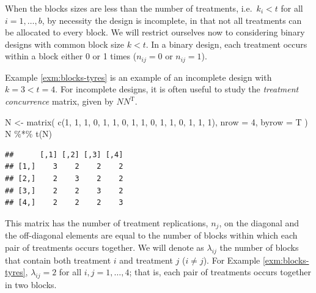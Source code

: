 \documentclass[
]{book}
\newenvironment{Shaded}{\begin{snugshade}}{\end{snugshade}}
\newcommand{\AttributeTok}[1]{\textcolor[rgb]{0.77,0.63,0.00}{#1}}
\newcommand{\DecValTok}[1]{\textcolor[rgb]{0.00,0.00,0.81}{#1}}
\newcommand{\FunctionTok}[1]{\textcolor[rgb]{0.00,0.00,0.00}{#1}}
\newcommand{\NormalTok}[1]{#1}
\newcommand{\OtherTok}[1]{\textcolor[rgb]{0.56,0.35,0.01}{#1}}
\newcommand{\SpecialCharTok}[1]{\textcolor[rgb]{0.00,0.00,0.00}{#1}}
\theoremstyle{definition}
\theoremstyle{definition}
\theoremstyle{definition}
\theoremstyle{definition}
\theoremstyle{remark}
\begin{document}
When the blocks sizes are less than the number of treatments, i.e.~\(k_i < t\) for all \(i=1,\ldots, b\), by necessity the design is incomplete, in that not all treatments can be allocated to every block. We will restrict ourselves now to considering binary designs with common block size \(k<t\). In a binary design, each treatment occurs within a block either 0 or 1 times (\(n_{ij}=0\) or \(n_{ij}=1\)).

Example \ref{exm:blocks-tyres} is an example of an incomplete design with \(k=3<t=4\). For incomplete designs, it is often useful to study the \emph{treatment concurrence} matrix, given by \(NN^{\mathrm{T}}\).

\begin{Shaded}
\begin{Highlighting}[]
\NormalTok{N }\OtherTok{\textless{}{-}} \FunctionTok{matrix}\NormalTok{(}
  \FunctionTok{c}\NormalTok{(}\DecValTok{1}\NormalTok{, }\DecValTok{1}\NormalTok{, }\DecValTok{1}\NormalTok{, }\DecValTok{0}\NormalTok{,}
    \DecValTok{1}\NormalTok{, }\DecValTok{1}\NormalTok{, }\DecValTok{0}\NormalTok{, }\DecValTok{1}\NormalTok{,}
    \DecValTok{1}\NormalTok{, }\DecValTok{0}\NormalTok{, }\DecValTok{1}\NormalTok{, }\DecValTok{1}\NormalTok{,}
    \DecValTok{0}\NormalTok{, }\DecValTok{1}\NormalTok{, }\DecValTok{1}\NormalTok{, }\DecValTok{1}\NormalTok{),}
  \AttributeTok{nrow =} \DecValTok{4}\NormalTok{, }\AttributeTok{byrow =}\NormalTok{ T}
\NormalTok{)}
\NormalTok{N }\SpecialCharTok{\%*\%} \FunctionTok{t}\NormalTok{(N)}
\end{Highlighting}
\end{Shaded}

\begin{verbatim}
##      [,1] [,2] [,3] [,4]
## [1,]    3    2    2    2
## [2,]    2    3    2    2
## [3,]    2    2    3    2
## [4,]    2    2    2    3
\end{verbatim}

This matrix has the number of treatment replications, \(n_j\), on the diagonal and the off-diagonal elements are equal to the number of blocks within which each pair of treatments occurs together. We will denote as \(\lambda_{ij}\) the number of blocks that contain both treatment \(i\) and treatment \(j\) (\(i\ne j\)). For Example \ref{exm:blocks-tyres}, \(\lambda_{ij} = 2\) for all \(i,j = 1,\ldots, 4\); that is, each pair of treatments occurs together in two blocks.
\end{document}
